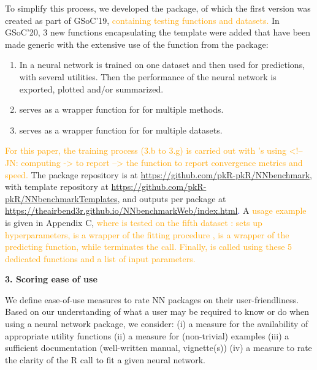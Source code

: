 To simplify this process, we developed the  package, of
which the first version was created as part of GSoC'19,
\textcolor{orange}{containing testing functions and datasets.} In
GSoC'20, 3 new functions encapsulating the template were added that have
been made generic with the extensive use of the  function
from the  package:

\begin{enumerate}
\def\labelenumi{\arabic{enumi}.}
\tightlist
\item
  In  a neural network is trained on one
  dataset and then used for predictions, with several utilities. Then
  the performance of the neural network is exported, plotted and/or
  summarized.
\item
   serves as a wrapper function for
   for multiple methods.
\item
   serves as a wrapper function for
   for multiple datasets.
\end{enumerate}

\textcolor{orange}{For this paper, the training process (3.b to 3.g) is
carried out with 's  using 
<!-- JN: computing -> to report -->
the  function to report convergence metrics and speed.}
The package repository is at
\url{https://github.com/pkR-pkR/NNbenchmark}, with template repository
at \url{https://github.com/pkR-pkR/NNbenchmarkTemplates}, and outputs
per package at
\textcolor{blue}{\url{https://theairbend3r.github.io/NNbenchmarkWeb/index.html}.}
A \textcolor{orange}{usage example}  is given
in Appendix C,
\textcolor{orange}{where  is tested on the fifth dataset
:  sets up hyperparameters,
 is a wrapper of the fitting procedure ,
 is a wrapper of the predicting function,
while  terminates the call.
Finally,  is called using these 5 
dedicated functions and a list of input parameters.
}

\textbf{3. Scoring ease of use}

We define ease-of-use measures to rate NN packages on their
user-friendliness. Based on our understanding of what a user may be
required to know or do when using a neural network package, we consider:
(i) a measure for the availability of appropriate utility functions (ii)
a measure for (non-trivial) examples (iii) a sufficient documentation
(well-written manual, vignette(s)) (iv) a measure to rate the clarity of
the \textsf{R} call to fit a given neural network.

